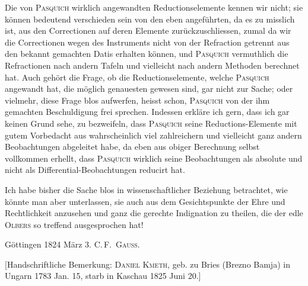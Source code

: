 Die von \textsc{Pasquich} wirklich angewandten Reductionselemente kennen wir nicht; sie können
bedeutend verschieden sein von den eben angeführten, da es zu misslich ist, aus den Correctionen auf  deren Elemente zurückzuschliessen, zumal da wir die Correctionen wegen des Instruments nicht von der Refraction getrennt aus den bekannt gemachten Datis erhalten können, und \textsc{Pasquich} vermuthlich die Refractionen nach andern Tafeln und vielleicht nach andern Methoden berechnet hat. Auch gehört die Frage, ob die Reductionselemente, welche \textsc{Pasquich} angewandt hat, die möglich genauesten gewesen sind, gar nicht zur Sache; oder vielmehr, diese Frage blos aufwerfen, heisst schon, \textsc{Pasquich} von der ihm gemachten Beschuldigung frei sprechen. Indessen erkläre ich gern, dass ich gar keinen Grund sehe, zu bezweifeln, dass \textsc{Pasquich} seine Reductions-Elemente mit gutem Vorbedacht aus wahrscheinlich viel zahlreichern und vielleicht ganz andern Beobachtungen abgeleitet habe, da eben aus obiger Berechnung selbst vollkommen erhellt, dass \textsc{Pasquich} wirklich seine Beobachtungen als absolute und nicht als Differential-Beobachtungen reducirt hat.

Ich habe bisher die Sache blos in wissenschaftlicher Beziehung betrachtet, wie könnte man aber unterlassen, sie auch aus dem Gesichtspunkte der Ehre und Rechtlichkeit anzusehen und ganz die gerechte Indignation zu theilen, die der edle \textsc{Olbers} so treffend ausgesprochen hat!

\noindent Göttingen 1824 März 3. \hfill C.\,F.\ \textsc{Gauss}.

[Handschriftliche Bemerkung: \textsc{Daniel Kmeth}, geb. zu Bries (Brezno Bamja) in Ungarn 1783 Jan. 15, starb in Kaschau 1825 Juni 20.]
